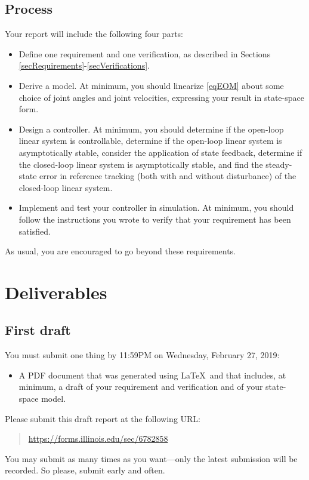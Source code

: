 \documentclass[12pt]{article}
\begin{document}
\subsection{Process}

Your report will include the following four parts:
\begin{itemize}

\item Define one requirement and one verification, as described in Sections \ref{secRequirements}-\ref{secVerifications}.

\item Derive a model. At minimum, you should linearize \eqref{eqEOM} about some choice of joint angles and joint velocities, expressing your result in state-space form.

\item Design a controller. At minimum, you should determine if the open-loop linear system is controllable, determine if the open-loop linear system is asymptotically stable, consider the application of state feedback, determine if the closed-loop linear system is asymptotically stable, and find the steady-state error in reference tracking (both with and without disturbance) of the closed-loop linear system.

\item Implement and test your controller in simulation. At minimum, you should follow the instructions you wrote to verify that your requirement has been satisfied.

\end{itemize}
As usual, you are encouraged to go beyond these requirements.


\section{Deliverables}

\subsection{First draft}

You must submit one thing by 11:59PM on Wednesday, February 27, 2019:
\begin{itemize}
\item A PDF document that was generated using \LaTeX\ and that includes, at minimum, a draft of your requirement and verification and of your state-space model.
\end{itemize}
Please submit this draft report at the following URL:
\begin{quote}
\url{https://forms.illinois.edu/sec/6782858}
\end{quote}
You may submit as many times as you want---only the latest submission will be recorded. So please, submit early and often.
\end{document}
